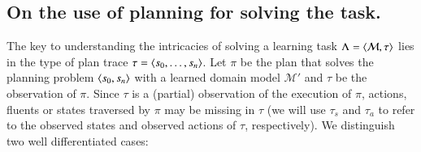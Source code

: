 \subsection{On the use of planning for solving the task.}

The key to understanding the intricacies of solving a learning task $\Lambda={\langle \mathcal{M},\tau \rangle}$ lies in the type of plan trace $\tau = {\langle s_0, \ldots, s_n \rangle}$. Let $\pi$ be the plan that solves the planning problem ${\langle s_0,s_n \rangle}$ with a learned domain model $\mathcal{M}'$ and $\tau$ be the observation of $\pi$. Since $\tau$ is a (partial) observation of the execution of $\pi$, actions, fluents or states traversed by $\pi$ may be missing in $\tau$ (we will use $\tau_s$ and $\tau_a$ to refer to the observed states and observed actions of $\tau$, respectively). We distinguish two well differentiated cases:

